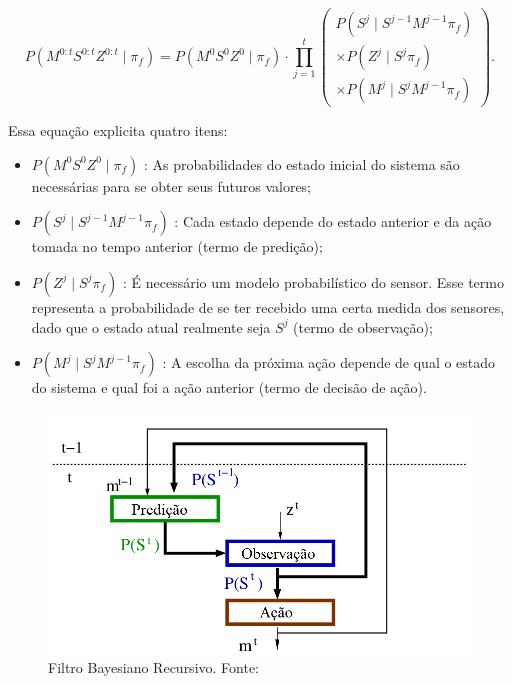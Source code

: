 \begin{equation} \label{equation:FiltroBayesiano1}
        P ( M^{0: t} S^{0: t} Z^{0: t} \mid \pi_f ) = P ( M^0 S^0 Z^0 \mid \pi_f ) \cdot \prod\limits_{j =1}^{t} 
        \left(
            \begin{array}{l}
                P( S^j \mid S^{j -1} M^{j -1} \pi_f ) \\
                \times P( Z^j \mid S^j \pi_f ) \\
                \times P( M^j \mid S^j M^{j -1} \pi_f )
            \end{array}
        \right).
\end{equation}

Essa equação explicita quatro itens:

\begin{itemize}
  \item $ P \left( M^0 S^0 Z^0 \mid \pi_f \right) $ : As probabilidades do estado inicial do sistema são necessárias para se obter seus futuros valores;
  \item $ P \left( S^j \mid S^{j-1} M^{j-1} \pi_f \right) $ : Cada estado depende do estado anterior e da ação tomada no tempo anterior (termo de predição);
  \item $ P \left( Z^j \mid S^j \pi_f \right) $ : É necessário um modelo probabilístico do sensor. Esse termo representa a probabilidade de se ter recebido uma certa medida dos sensores, dado que o estado atual realmente seja $ S^j $ (termo de observação);
  \item $ P \left( M^j \mid S^j M^{j-1} \pi_f \right) $ : A escolha da próxima ação depende de qual o estado do sistema e qual foi a ação anterior (termo de decisão de ação).
\end{itemize}

\begin{figure}[h]
    \centering
    \includegraphics[width=120mm]{images/modelo_bayesiano-carla}
    \caption{\label{img:ModeloProbabilisticoCarla}Filtro Bayesiano Recursivo. Fonte: \cite{Koike:2005}}
\end{figure}

